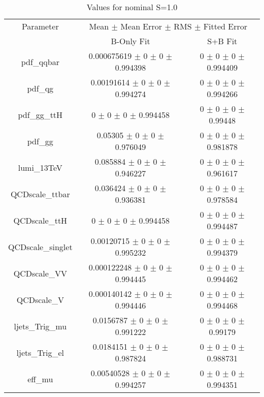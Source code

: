 \begin{table}
\centering
\caption{Values for nominal S=1.0}
\begin{tabular}{ccc}
\toprule
Parameter & \multicolumn{2}{c}{Mean $\pm$ Mean Error $\pm$ RMS $\pm$ Fitted Error}\\
 & B-Only Fit & S+B Fit\\
\midrule
pdf\_qqbar & \num{0.000675619} $\pm$ \num{0} $\pm$ \num{0} $\pm$ \num{0.994398} & \num{0} $\pm$ \num{0} $\pm$ \num{0} $\pm$ \num{0.994409}\\
pdf\_qg & \num{0.00191614} $\pm$ \num{0} $\pm$ \num{0} $\pm$ \num{0.994274} & \num{0} $\pm$ \num{0} $\pm$ \num{0} $\pm$ \num{0.994266}\\
pdf\_gg\_ttH & \num{0} $\pm$ \num{0} $\pm$ \num{0} $\pm$ \num{0.994458} & \num{0} $\pm$ \num{0} $\pm$ \num{0} $\pm$ \num{0.99448}\\
pdf\_gg & \num{0.05305} $\pm$ \num{0} $\pm$ \num{0} $\pm$ \num{0.976049} & \num{0} $\pm$ \num{0} $\pm$ \num{0} $\pm$ \num{0.981878}\\
lumi\_13TeV & \num{0.085884} $\pm$ \num{0} $\pm$ \num{0} $\pm$ \num{0.946227} & \num{0} $\pm$ \num{0} $\pm$ \num{0} $\pm$ \num{0.961617}\\
QCDscale\_ttbar & \num{0.036424} $\pm$ \num{0} $\pm$ \num{0} $\pm$ \num{0.936381} & \num{0} $\pm$ \num{0} $\pm$ \num{0} $\pm$ \num{0.978584}\\
QCDscale\_ttH & \num{0} $\pm$ \num{0} $\pm$ \num{0} $\pm$ \num{0.994458} & \num{0} $\pm$ \num{0} $\pm$ \num{0} $\pm$ \num{0.994487}\\
QCDscale\_singlet & \num{0.00120715} $\pm$ \num{0} $\pm$ \num{0} $\pm$ \num{0.995232} & \num{0} $\pm$ \num{0} $\pm$ \num{0} $\pm$ \num{0.994379}\\
QCDscale\_VV & \num{0.000122248} $\pm$ \num{0} $\pm$ \num{0} $\pm$ \num{0.994445} & \num{0} $\pm$ \num{0} $\pm$ \num{0} $\pm$ \num{0.994462}\\
QCDscale\_V & \num{0.000140142} $\pm$ \num{0} $\pm$ \num{0} $\pm$ \num{0.994446} & \num{0} $\pm$ \num{0} $\pm$ \num{0} $\pm$ \num{0.994468}\\
ljets\_Trig\_mu & \num{0.0156787} $\pm$ \num{0} $\pm$ \num{0} $\pm$ \num{0.991222} & \num{0} $\pm$ \num{0} $\pm$ \num{0} $\pm$ \num{0.99179}\\
ljets\_Trig\_el & \num{0.0184151} $\pm$ \num{0} $\pm$ \num{0} $\pm$ \num{0.987824} & \num{0} $\pm$ \num{0} $\pm$ \num{0} $\pm$ \num{0.988731}\\
eff\_mu & \num{0.00540528} $\pm$ \num{0} $\pm$ \num{0} $\pm$ \num{0.994257} & \num{0} $\pm$ \num{0} $\pm$ \num{0} $\pm$ \num{0.994351}\\

\end{tabular}
\end{table}
